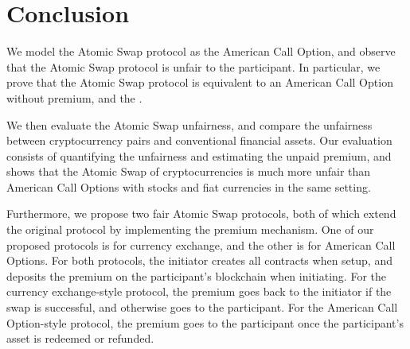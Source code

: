 \section{Conclusion}
\label{sec:conclusion}


We model the Atomic Swap protocol as the American Call Option,
and observe that the Atomic Swap protocol is unfair to the participant.
In particular, we prove that the Atomic Swap protocol is equivalent to an American Call Option without  premium,
and the .

We then evaluate the Atomic Swap unfairness, and compare the unfairness between cryptocurrency pairs and conventional financial assets.
Our evaluation consists of quantifying the unfairness and estimating the unpaid premium,
and shows that the Atomic Swap of cryptocurrencies is much more unfair than American Call Options with stocks and fiat currencies in the same setting.

Furthermore, we propose two fair Atomic Swap protocols, both of which extend the original protocol by implementing the premium mechanism.
One of our proposed protocols is for currency exchange, and the other is for American Call Options.
For both protocols, the initiator creates all contracts when setup, and deposits the premium on the participant's blockchain when initiating.
For the currency exchange-style protocol, the premium goes back to the initiator if the swap is successful, and otherwise goes to the participant.
For the American Call Option-style protocol, the premium goes to the participant once the participant's asset is redeemed or refunded.
